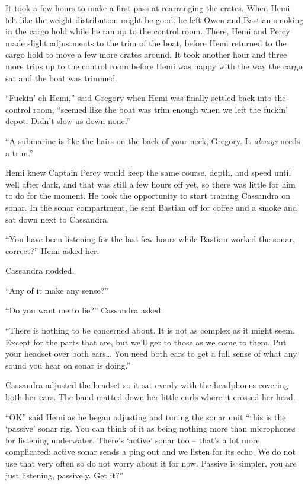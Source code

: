 \documentclass[]{scrbook}
\begin{document}
It took a few hours to make a first pass at rearranging the crates. When
Hemi felt like the weight distribution might be good, he left Owen and
Bastian smoking in the cargo hold while he ran up to the control room.
There, Hemi and Percy made slight adjustments to the trim of the boat,
before Hemi returned to the cargo hold to move a few more crates around.
It took another hour and three more trips up to the control room before
Hemi was happy with the way the cargo sat and the boat was trimmed.

``Fuckin' eh Hemi,'' said Gregory when Hemi was finally settled back
into the control room, ``seemed like the boat was trim enough when we
left the fuckin' depot. Didn't slow us down none.''

``A submarine is like the hairs on the back of your neck, Gregory. It
\emph{always} needs a trim.''

Hemi knew Captain Percy would keep the same course, depth, and speed
until well after dark, and that was still a few hours off yet, so there
was little for him to do for the moment. He took the opportunity to
start training Cassandra on sonar. In the sonar compartment, he sent
Bastian off for coffee and a smoke and sat down next to Cassandra.

``You have been listening for the last few hours while Bastian worked
the sonar, correct?'' Hemi asked her.

Cassandra nodded.

``Any of it make any sense?''

``Do you want me to lie?'' Cassandra asked.

``There is nothing to be concerned about. It is not as complex as it
might seem. Except for the parts that are, but we'll get to those as we
come to them. Put your headset over both ears\ldots{} You need both ears
to get a full sense of what any sound you hear on sonar is doing.''

Cassandra adjusted the headset so it sat evenly with the headphones
covering both her ears. The band matted down her little curls where it
crossed her head.

``OK'' said Hemi as he began adjusting and tuning the sonar unit ``this
is the `passive' sonar rig. You can think of it as being nothing more
than microphones for listening underwater. There's `active' sonar too --
that's a lot more complicated: active sonar sends a ping out and we
listen for its echo. We do not use that very often so do not worry about
it for now. Passive is simpler, you are just listening, passively. Get
it?''
\end{document}
